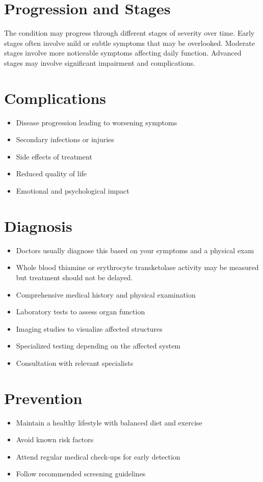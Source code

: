 \section{Progression and Stages}
The condition may progress through different stages of severity over time. Early stages often involve mild or subtle symptoms that may be overlooked. Moderate stages involve more noticeable symptoms affecting daily function. Advanced stages may involve significant impairment and complications.
\section{Complications}
\begin{itemize}[noitemsep]
  \item Disease progression leading to worsening symptoms
  \item Secondary infections or injuries
  \item Side effects of treatment
  \item Reduced quality of life
  \item Emotional and psychological impact
\end{itemize}
\section{Diagnosis}
\begin{itemize}[noitemsep]
  \item Doctors usually diagnose this based on your symptoms and a physical exam
  \item Whole blood thiamine or erythrocyte transketolase activity may be measured but treatment should not be delayed.
  \item Comprehensive medical history and physical examination
  \item Laboratory tests to assess organ function
  \item Imaging studies to visualize affected structures
  \item Specialized testing depending on the affected system
  \item Consultation with relevant specialists
\end{itemize}
\section{Prevention}
\begin{itemize}[noitemsep]
  \item Maintain a healthy lifestyle with balanced diet and exercise
  \item Avoid known risk factors
  \item Attend regular medical check-ups for early detection
  \item Follow recommended screening guidelines
\end{itemize}
